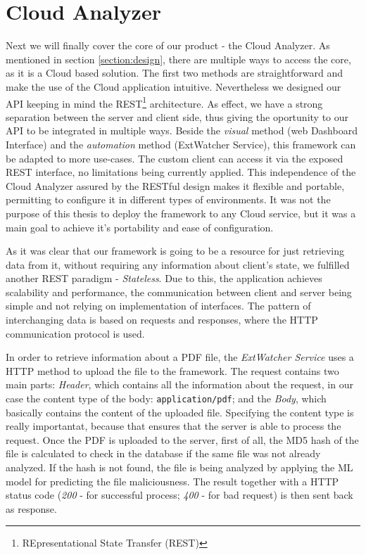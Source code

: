 \section{Cloud Analyzer}
\label{section:cloudApi}
Next we will finally cover the core of our product - the Cloud Analyzer. As mentioned in section \ref{section:design}, there are multiple ways to access the core, as it is a Cloud based solution. The first two methods are straightforward and make the use of the Cloud application intuitive. Nevertheless we designed our API keeping in mind the REST\footnote{REpresentational State Transfer (REST)} architecture. As effect, we have a strong separation between the server and client side, thus giving the oportunity to our API to be integrated in multiple ways. Beside the \textit{visual} method (web Dashboard Interface) and the \textit{automation} method (ExtWatcher Service), this framework can be adapted to more use-cases. The custom client can access it via the exposed REST interface, no limitations being currently applied. This independence of the Cloud Analyzer assured by the RESTful design makes it flexible and portable, permitting to configure it in different types of environments. It was not the purpose of this thesis to deploy the framework to any Cloud service, but it was a main goal to achieve it's portability and ease of configuration. \par 
As it was clear that our framework is going to be a resource for just retrieving data from it, without requiring any information about client's state, we fulfilled another REST paradigm - \textit{Stateless}. Due to this, the application achieves scalability and performance, the communication between client and server being simple and not relying on implementation of interfaces. The pattern of interchanging data is based on requests and responses, where the HTTP communication protocol is used. \par
In order to retrieve information about a PDF file, the \textit{ExtWatcher Service} uses a  HTTP method to upload the file to the framework. The request contains two main parts: \textit{Header}, which contains all the information about the request, in our case the content type of the body: \texttt{application/pdf}; and the \textit{Body}, which basically contains the content of the uploaded file. Specifying the content type is really importantat, because that ensures that the server is able to process the request. Once the PDF is uploaded to the server, first of all, the MD5 hash of the file is calculated to check in the database if the same file was not already analyzed. If the hash is not found, the file is being analyzed by applying the ML model for predicting the file maliciousness. The result together with a HTTP status code (\textit{200} - for successful process; \textit{400} - for bad request) is then sent back as response. \par
